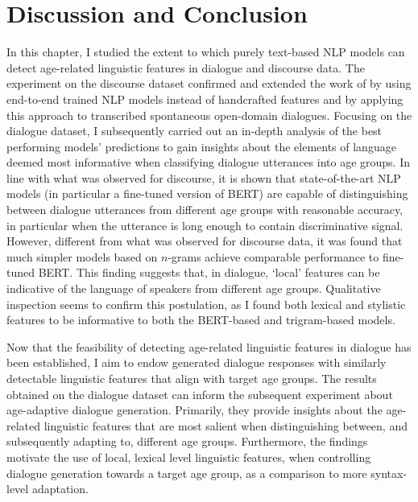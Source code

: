 \section{Discussion and Conclusion}\label{sec:exp1_discussion_conclusion}

In this chapter, I studied the extent to which purely text-based NLP models can detect age-related linguistic features in dialogue and discourse data.
The experiment on the discourse dataset confirmed and extended the work of \cite{schler2006effects} by using end-to-end trained NLP models instead of handcrafted features and by applying this approach to transcribed spontaneous open-domain dialogues.
Focusing on the dialogue dataset, I subsequently carried out an in-depth analysis of the best performing models' predictions to gain insights about the elements of language deemed most informative when classifying dialogue utterances into age groups.
In line with what was observed for discourse, it is shown that state-of-the-art NLP models (in particular a fine-tuned version of BERT) are capable of distinguishing between dialogue utterances from different age groups with reasonable accuracy, in particular when the utterance is long enough to contain discriminative signal.
However, different from what was observed for discourse data, it was found that much simpler models based on $n$-grams achieve comparable performance to fine-tuned BERT. 
This finding suggests that, in dialogue, ‘local’ features can be indicative of the language of speakers from different age groups. Qualitative inspection seems to confirm this postulation, as I found both lexical and stylistic features to be informative to both the BERT-based and trigram-based models.

Now that the feasibility of detecting age-related linguistic features in dialogue has been established, I aim to endow generated dialogue responses with similarly detectable linguistic features that align with target age groups. 
The results obtained on the dialogue dataset can inform the subsequent experiment about age-adaptive dialogue generation. 
Primarily, they provide insights about the age-related linguistic features that are most salient when distinguishing between, and subsequently adapting to, different age groups.
Furthermore, the findings motivate the use of local, lexical level linguistic features, when controlling dialogue generation towards a target age group, as a comparison to more syntax-level adaptation.

